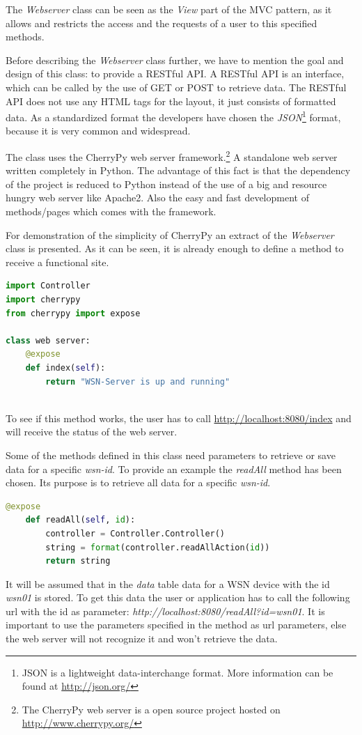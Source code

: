 The \textit{Webserver} class can be seen as the \textit{View} part of the MVC pattern, as it allows and restricts the access and the requests of a user to this specified methods.

Before describing the \textit{Webserver} class further, we have to mention the goal and design of this class: to provide a RESTful API. A RESTful API is an interface, which can be called by the use of GET or POST to retrieve data. The RESTful API does not use any HTML tags for the layout, it just consists of formatted data. As a standardized format the developers have chosen the \textit{JSON}\footnote{JSON is a lightweight data-interchange format. More information can be found at \url{http://json.org/}} format, because it is very common and widespread.

The class uses the CherryPy web server framework.\footnote{The CherryPy web server is a open source project hosted on \url{http://www.cherrypy.org/}} A standalone web server written completely in Python. The advantage of this fact is that the dependency of the project is reduced to Python instead of the use of a big and resource hungry web server like Apache2. Also the easy and fast development of methods/pages which comes with the framework.

For demonstration of the simplicity of CherryPy an extract of the \textit{Webserver} class is presented. As it can be seen, it is already enough to define a method to receive a functional site. 
\begin{lstlisting}[language=Python]
import Controller
import cherrypy
from cherrypy import expose

class web server:
    @expose
    def index(self):
        return "WSN-Server is up and running"
       
\end{lstlisting}

To see if this method works, the user has to call \url{http://localhost:8080/index} and will receive the status of the web server.

\newpage
Some of the methods defined in this class need parameters to retrieve or save data for a specific \textit{wsn-id}. To provide an example the \textit{readAll} method has been chosen. Its purpose is to retrieve all data for a specific \textit{wsn-id}.
\begin{lstlisting}[language=Python]
@expose
    def readAll(self, id):
        controller = Controller.Controller()
        string = format(controller.readAllAction(id))
        return string
\end{lstlisting}
It will be assumed that in the \textit{data} table data for a WSN device with the id \textit{wsn01} is stored. To get this data the user or application has to call the following url with the id as parameter: \textit{http://localhost:8080/readAll?id=wsn01}.
It is important to use the parameters specified in the method as url parameters, else the web server will not recognize it and won't retrieve the data. 

